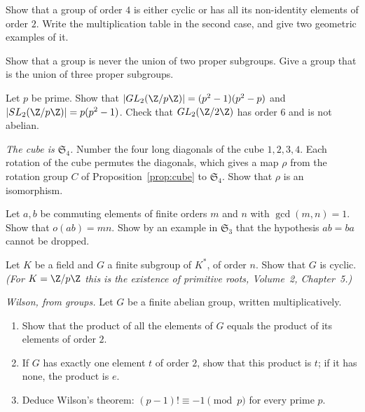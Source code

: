\begin{exercise}[$\star$]\label{ex:order4}
Show that a group of order $4$ is either cyclic or has all its non-identity elements of order $2$. Write the multiplication table in the second case, and give two geometric examples of it.
\end{exercise}

\begin{exercise}[$\star\star$]\label{ex:union}
Show that a group is never the union of two proper subgroups. Give a group that is the union of three proper subgroups.
\end{exercise}

\begin{exercise}[$\star\star$]\label{ex:gl2}
Let $p$ be prime. Show that $|GL_2(\Z/p\Z)|=(p^2-1)(p^2-p)$ and $|SL_2(\Z/p\Z)|=p(p^2-1)$. Check that $GL_2(\Z/2\Z)$ has order $6$ and is not abelian.
\end{exercise}

\begin{exercise}[$\star\star$]\label{ex:cubeS4}
\emph{The cube is $\mathfrak S_4$.} Number the four long diagonals of the cube $1,2,3,4$. Each rotation of the cube permutes the diagonals, which gives a map $\rho$ from the rotation group $C$ of Proposition~\ref{prop:cube} to $\mathfrak S_4$. Show that $\rho$ is an isomorphism.
\end{exercise}

\begin{exercise}[$\star\star$]\label{ex:prodorder}
Let $a,b$ be commuting elements of finite orders $m$ and $n$ with $\gcd(m,n)=1$. Show that $o(ab)=mn$. Show by an example in $\mathfrak S_3$ that the hypothesis $ab=ba$ cannot be dropped.
\end{exercise}

\begin{exercise}[$\star\star$]\label{ex:fieldcyclic}
Let $K$ be a field and $G$ a finite subgroup of $K^*$, of order $n$. Show that $G$ is cyclic. \emph{(For $K=\Z/p\Z$ this is the existence of primitive roots, Volume~2, Chapter~5.)}
\end{exercise}

\begin{exercise}[$\star$]\label{ex:wilson}
\emph{Wilson, from groups.} Let $G$ be a finite abelian group, written multiplicatively.
\begin{enumerate}[label=(\alph*)]
\item Show that the product of all the elements of $G$ equals the product of its elements of order $2$.
\item If $G$ has exactly one element $t$ of order $2$, show that this product is $t$; if it has none, the product is $e$.
\item Deduce Wilson's theorem: $(p-1)!\equiv-1\pmod p$ for every prime $p$.
\end{enumerate}
\end{exercise}

